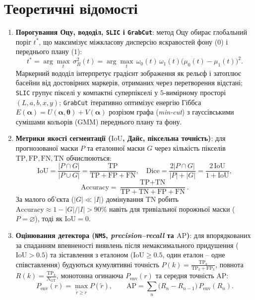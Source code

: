 \documentclass[14pt, a4paper]{extarticle}
\begin{document}
\section{Теоретичні відомості}
\begin{enumerate}
    \item \textbf{Порогування Оцу, вододіл, \texttt{SLIC} і \texttt{GrabCut}}: метод Оцу обирає глобальний поріг $t^*$, що максимізує міжкласову дисперсію яскравостей фону ($0$) і переднього плану ($1$):
    \begin{equation}\label{eq:otsu}
        t^* = \arg\max_{t} \, \sigma_B^2(t) = \arg\max_{t} \, \omega_0(t)\,\omega_1(t)\bigl(\mu_0(t) - \mu_1(t)\bigr)^2.
    \end{equation}
    Маркерний вододіл інтерпретує градієнт зображення як рельєф і затоплює басейни від достовірних маркерів, отриманих через перетворення відстані; \texttt{SLIC} групує пікселі у компактні суперпікселі у $5$-вимірному просторі $(L, a, b, x, y)$; \texttt{GrabCut} ітеративно оптимізує енергію Гіббса $E(\boldsymbol{\alpha}) = U(\boldsymbol{\alpha}, \boldsymbol{\theta}) + V(\boldsymbol{\alpha})$ розрізом графа (\emph{min-cut}) з гауссівськими сумішами кольорів (GMM) переднього плану та фону.

    \item \textbf{Метрики якості сегментації ($\text{IoU}$, Дайс, піксельна точність)}: для прогнозованої маски $P$ та еталонної маски $G$ через кількість пікселів $\text{TP}, \text{FP}, \text{FN}, \text{TN}$ обчислюються:
    \begin{equation}\label{eq:seg_metrics}
        \text{IoU} = \frac{|P \cap G|}{|P \cup G|} = \frac{\text{TP}}{\text{TP} + \text{FP} + \text{FN}}, \quad
        \text{Dice} = \frac{2|P \cap G|}{|P| + |G|} = \frac{2\,\text{IoU}}{1 + \text{IoU}},
    \end{equation}
    \begin{equation}\label{eq:acc}
        \text{Accuracy} = \frac{\text{TP} + \text{TN}}{\text{TP} + \text{TN} + \text{FP} + \text{FN}}.
    \end{equation}
    За малого об'єкта ($|G| \ll |I|$) домінування $\text{TN}$ робить $\text{Accuracy} \approx 1 - |G|/|I| > 90\%$ навіть для тривіальної порожньої маски ($P = \varnothing$), тоді як $\text{IoU} = 0$.

    \item \textbf{Оцінювання детектора (\texttt{NMS}, \emph{precision--recall} та $\text{AP}$)}: для впорядкованих за спаданням впевненості виявлень після немаксимального придушення ($\text{IoU} > 0.5$) та зіставлення з еталоном ($\text{IoU} \ge 0.5$, один еталон -- одне співставлення) будуються кумулятивні точність $P(k) = \frac{\text{TP}_k}{\text{TP}_k + \text{FP}_k}$, повнота $R(k) = \frac{\text{TP}_k}{N_{\text{GT}}}$, монотонна огинаюча $P_{\text{env}}(r)$ та середня точність $\text{AP}$:
    \begin{equation}\label{eq:ap}
        P_{\text{env}}(r) = \max_{\tilde{r} \ge r} P(\tilde{r}), \qquad
        \text{AP} = \sum_{n} \bigl(R_n - R_{n-1}\bigr)\,P_{\text{env}}(R_n).
    \end{equation}
\end{enumerate}
\end{document}
